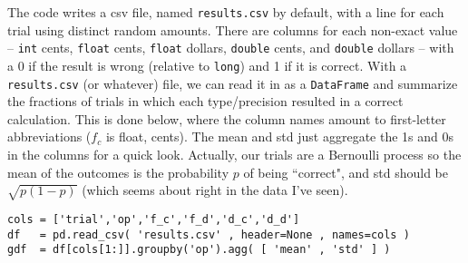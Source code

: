 \documentclass[11pt, oneside]{amsart}   	%
\begin{document}
The code writes a csv file, named \texttt{results.csv} by default, with a line for each trial using distinct random amounts. There are columns for each non-exact value -- \texttt{int} cents, \texttt{float} cents, \texttt{float} dollars, \texttt{double} cents, and \texttt{double} dollars -- with a 0 if the result is wrong (relative to \texttt{long}) and 1 if it is correct. With a \texttt{results.csv} (or whatever) file, we can read it in as a \texttt{DataFrame} and summarize the fractions of trials in which each type/precision resulted in a correct calculation. This is done below, where the column names amount to first-letter abbreviations ($f_c$ is float, cents). The mean and std just aggregate the 1s and 0s in the columns for a quick look. Actually, our trials are a Bernoulli process so the mean of the outcomes is the probability $p$ of being ``correct", and std should be $\sqrt{p(1-p)}$ (which seems about right in the data I've seen). 

\begin{verbatim}
cols = ['trial','op','f_c','f_d','d_c','d_d']
df   = pd.read_csv( 'results.csv' , header=None , names=cols )
gdf  = df[cols[1:]].groupby('op').agg( [ 'mean' , 'std' ] )
\end{verbatim}
\end{document}
